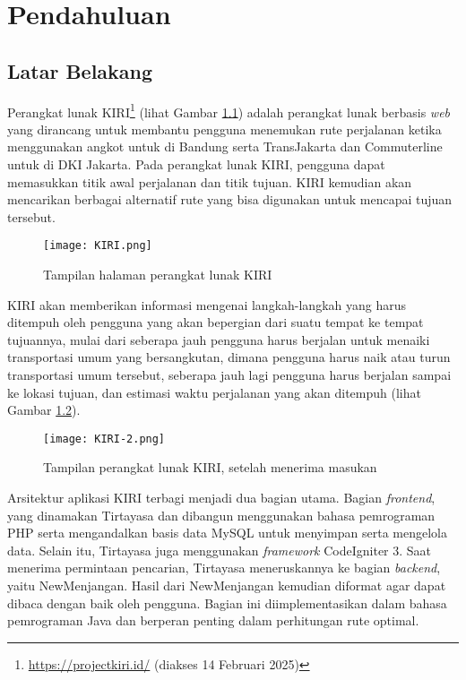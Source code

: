 \chapter{Pendahuluan}
\label{chap:intro}
   
\section{Latar Belakang}
\label{sec:label}
Perangkat lunak KIRI\footnote{\url{https://projectkiri.id/} (diakses 14 Februari 2025)} (lihat Gambar \ref{fig:kiri}) adalah perangkat lunak berbasis \textit{web} yang dirancang untuk membantu pengguna menemukan rute perjalanan ketika menggunakan angkot untuk di Bandung serta TransJakarta dan Commuterline untuk di DKI Jakarta. Pada perangkat lunak KIRI, pengguna dapat memasukkan titik awal perjalanan dan titik tujuan. KIRI kemudian akan mencarikan berbagai alternatif rute yang bisa digunakan untuk mencapai tujuan tersebut.
\begin{figure}[h] 
	\centering  
	\texttt{[image: KIRI.png]}  
	\caption{Tampilan halaman perangkat lunak KIRI}
	\label{fig:kiri} 
\end{figure}

KIRI akan memberikan informasi mengenai langkah-langkah yang harus ditempuh oleh pengguna yang akan bepergian dari suatu tempat ke tempat tujuannya, mulai dari seberapa jauh pengguna harus berjalan untuk menaiki transportasi umum yang bersangkutan, dimana pengguna harus naik atau turun transportasi umum tersebut, seberapa jauh lagi pengguna harus berjalan sampai ke lokasi tujuan, dan estimasi waktu perjalanan yang akan ditempuh (lihat Gambar \ref{fig:kiri2}).
\begin{figure}[H] 
	\centering  
	\texttt{[image: KIRI-2.png]}  
	\caption{Tampilan perangkat lunak KIRI, setelah menerima masukan}
	\label{fig:kiri2} 
\end{figure}

Arsitektur aplikasi KIRI terbagi menjadi dua bagian utama. Bagian \textit{frontend}, yang dinamakan Tirtayasa dan dibangun menggunakan bahasa pemrograman PHP serta mengandalkan basis data MySQL untuk menyimpan serta mengelola data. Selain itu, Tirtayasa juga menggunakan \textit{framework} CodeIgniter 3. Saat menerima permintaan pencarian, Tirtayasa meneruskannya ke bagian \textit{backend}, yaitu NewMenjangan. Hasil dari NewMenjangan kemudian diformat agar dapat dibaca dengan baik oleh pengguna. Bagian ini diimplementasikan dalam bahasa pemrograman Java dan berperan penting dalam perhitungan rute optimal.~\cite{nugroho_natali:17:KIRI}

